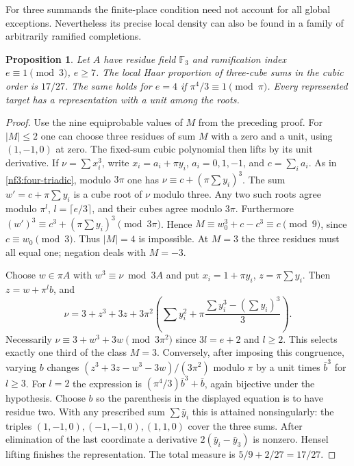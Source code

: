 \documentclass[11pt,letterpaper]{article}
\newtheorem{proposition}[proposition]{Proposition}
\theoremstyle{definition}
\numberwithin{equation}{section}
\begin{document}
For three summands the finite-place condition need not account for all
global exceptions. Nevertheless its precise local density can also be
found in a family of arbitrarily ramified completions.
\begin{proposition}\label{prop:three-cube-wild-density}
Let $A$ have residue field $\mathbb F_3$ and ramification index
$e\equiv1\pmod3$, $e\ge7$. The local Haar proportion of three-cube
sums in the cubic order is $17/27$. The same holds for $e=4$ if
$\pi^4/3\equiv1\pmod\pi$. Every represented target has a
representation with a unit among the roots.
\end{proposition}
\begin{proof}
Use the nine equiprobable values of $M$ from the preceding proof.
For $|M|\le2$ one can choose three residues of sum $M$ with a zero
and a unit, using $(1,-1,0)$ at zero. The fixed-sum cubic polynomial
then lifts by its unit derivative. If $\nu=\sum x_i^3$, write
$x_i=a_i+\pi y_i$, $a_i=0,1,-1$, and $c=\sum_i a_i$.
As in \eqref{nf3:four-triadic}, modulo $3\pi$ one has
$\nu\equiv c+(\pi\sum y_i)^3$.
The sum $w'=c+\pi\sum y_i$ is a cube root of $\nu$ modulo three.
Any two such roots agree modulo $\pi^l$, $l=\lceil e/3\rceil$,
and their cubes agree modulo $3\pi$. Furthermore
$(w')^3\equiv c^3+(\pi\sum y_i)^3\pmod{3\pi}$. Hence
$M\equiv w_0^3+c-c^3\equiv c\pmod9$, since $c\equiv w_0\pmod3$.
Thus $|M|=4$ is impossible. At $M=3$ the three residues must all
equal one; negation deals with $M=-3$.

Choose $w\in\pi A$ with $w^3\equiv\nu\bmod3A$ and put
$x_i=1+\pi y_i$, $z=\pi\sum y_i$. Then $z=w+\pi^l b$, and
\[
 \nu=3+z^3+3z+3\pi^2
       \left(\sum y_i^2+\pi\frac{\sum y_i^3-(\sum y_i)^3}{3}\right).
\]
Necessarily $\nu\equiv3+w^3+3w\pmod{3\pi^2}$ since $3l=e+2$
and $l\ge2$. This selects exactly one third of the class $M=3$.
Conversely, after imposing this congruence, varying $b$ changes
$(z^3+3z-w^3-3w)/(3\pi^2)$ modulo $\pi$ by a unit times
$\bar b^3$ for $l\ge3$. For $l=2$ the expression is
$(\pi^4/3)\bar b^3+\bar b$, again bijective under the hypothesis.
Choose $b$ so the parenthesis in the displayed equation is to have
residue two. With any prescribed sum $\sum\bar y_i$ this is attained
nonsingularly: the triples $(1,-1,0),(-1,-1,0),(1,1,0)$ cover
the three sums. After elimination of the last coordinate a derivative
$2(\bar y_i-\bar y_3)$ is nonzero. Hensel lifting finishes the
representation. The total measure is $5/9+2/27=17/27$.
\end{proof}
\end{document}

